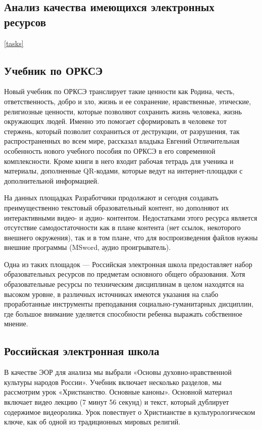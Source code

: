 \subsection{Анализ качества имеющихся электронных ресурсов}
\ref{tasks}
\subsection{Учебник по ОРКСЭ}

Новый учебник по ОРКСЭ транслирует такие ценности как Родина, честь, ответственность, добро и зло, жизнь и ее сохранение, нравственные, этические, религиозные ценности, которые позволяют сохранить жизнь человека, жизнь окружающих людей. Именно это помогает сформировать в человеке тот стержень, который позволит сохраниться от деструкции, от разрушения, так распространенных во всем мире, рассказал владыка Евгений \cite{pravobraz} Отличительная особенность нового учебного пособия по ОРКСЭ в его современной комплексности. Кроме книги в него входит рабочая тетрадь для ученика и материалы, дополненные QR-кодами, которые ведут на интернет-площадки с дополнительной информацией.

На данных площадках Разработчики продолжают и сегодня создавать преимущественно текстовый образовательный контент, но дополняют их интерактивными видео- и аудио- контентом\cite{opk}. Недостатками этого ресурса является отсутствие самодостаточности как в плане контента (нет ссылок, некоторого внешнего окружения), так и в том плане, что для воспроизведения файлов нужны внешние программы (MSword, аудио проигрыватель). 

Одна из таких площадок --- Российская электронная школа предоставляет набор образовательных ресурсов по предметам основного общего образования. Хотя образовательные ресурсы по техническим дисциплинам в целом находятся на высоком уровне, в различных источниках имеются указания на слабо проработанные инструменты преподавания социально-гуманитарных дисциплин, где большое внимание уделяется способности ребенка выражать собственное мнение.\cite{lastochkin19}

\subsection{Российская электронная школа}
В качестве ЭОР для анализа мы выбрали «Основы духовно-нравственной культуры народов России». Учебник включает несколько разделов, мы рассмотрим урок «Христианство. Основные каноны»\cite{sample}. Основной материал включает видео лекцию (7 минут 56 секунд) и текст, который дублирует содержимое видеоролика. Урок повествует о Христианстве в культурологическом ключе, как об одной из традиционных мировых религий.

